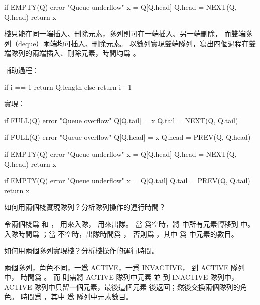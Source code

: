 \startCLRS
if EMPTY(Q)
	error "Queue underflow"
x = Q[Q.head]
Q.head = NEXT(Q, Q.head)
return x
\stopCLRS
\stopANSWER

\startEXERCISE
棧只能在同一端插入、刪除元素，隊列則可在一端插入、另一端刪除，
而{\EMP 雙端隊列（deque）}兩端均可插入、刪除元素。
以數列實現雙端隊列，寫出四個過程在雙端隊列的兩端插入、刪除元素，時間均爲 。
\stopEXERCISE

\startANSWER
輔助過程：

\startCLRS
if i == 1
	return Q.length
else
	return i - 1
\stopCLRS

實現：

\startCLRS
if FULL(Q)
	error "Queue overflow"
Q[Q.tail] = x
Q.tail = NEXT(Q, Q.tail)
\stopCLRS

\startCLRS
if FULL(Q)
	error "Queue overflow"
Q[Q.head] = x
Q.head = PREV(Q, Q.head)
\stopCLRS

\startCLRS
if EMPTY(Q)
	error "Queue underflow"
x = Q[Q.head]
Q.head = NEXT(Q, Q.head)
return x
\stopCLRS

\startCLRS
if EMPTY(Q)
	error "Queue underflow"
x = Q[Q.tail]
Q.tail = PREV(Q, Q.tail)
return x
\stopCLRS
\stopANSWER

如何用兩個棧實現隊列？分析隊列操作的運行時間？
\stopEXERCISE

\startANSWER
令兩個棧爲  和 ，  用來入隊，  用來出隊。
當  爲空時，將  中所有元素轉移到  中。
入隊時間爲 ；當  不空時，出隊時間爲 ，
否則爲 ，其中  爲  中元素的數目。
\stopANSWER

\startEXERCISE
如何用兩個隊列實現棧？分析棧操作的運行時間。
\stopEXERCISE

\startANSWER
兩個隊列，角色不同，一爲 ACTIVE，一爲 INVACTIVE，  到 ACTIVE 隊列中，
時間爲 。
而  則需將 ACTIVE 隊列中元素  並  到 INACTIVE 隊列中，
 ACTIVE 隊列中只留一個元素，最後這個元素  後返回；然後交換兩個隊列的角色。
  時間爲 ，其中  爲 隊列中元素數目。
\stopANSWER

\stopsection
